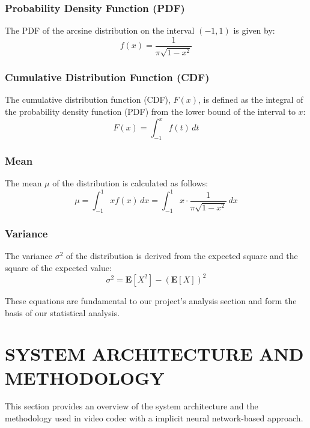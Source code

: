 \documentclass{ioereport}
\begin{document}
\subsubsection{Probability Density Function (PDF)}
The PDF of the arcsine distribution on the interval \((-1, 1)\) is given by:
\begin{equation}
f(x) = \frac{1}{\pi \sqrt{1-x^2}}
\end{equation}

\subsubsection{Cumulative Distribution Function (CDF)}
The cumulative distribution function (CDF), \( F(x) \), is defined as the integral of the probability density function (PDF) from the lower bound of the interval to \( x \):
\begin{equation}
F(x) = \int_{-1}^{x} f(t) \, dt
\end{equation}

\subsubsection{Mean}
The mean \(\mu\) of the distribution is calculated as follows:
\begin{equation}
\mu = \int_{-1}^{1} x f(x) \, dx = \int_{-1}^{1} x \cdot \frac{1}{\pi \sqrt{1-x^2}} \, dx
\end{equation}

\subsubsection{Variance}
The variance \(\sigma^2\) of the distribution is derived from the expected square and the square of the expected value:
\begin{equation}
\sigma^2 = \mathbf{E}[X^2] - (\mathbf{E}[X])^2
\end{equation}

These equations are fundamental to our project's analysis section and form the basis of our statistical analysis.

\pagebreak

\section{\MakeUppercase{System Architecture and Methodology}}
This section provides an overview of the system architecture and the methodology used in video \gls{codec} with a implicit neural network-based approach.
\end{document}
